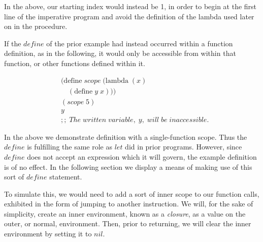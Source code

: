 In the above, our starting index would instead be 1, in order to begin at the first
line of the imperative program and avoid the definition of the lambda used later on
in the procedure.

If the $define$ of the prior example had instead occurred within a function definition, 
as in the following, it would only be accessible from within that function, or other 
functions defined within it.

\begin{figure}[ht]
\caption{}\label{scheme}
\begin{align*}
& (\text{define} \; scope \; (\text{lambda} \; (x)
\\& \quad (\text{define} \; y \; x)))
\\& (scope \; 5)
\\& y
\\& ;; \; The \; written \; variable, \; y, \; will \; be \; inaccessible.
\end{align*}
\end{figure}

In the above we demonstrate definition with a single-function scope. Thus the 
$define$ is fulfilling the same role as $let$ did in prior programs. However, since 
$define$ does not accept an expression which it will govern, the example definition 
is of no effect. In the following section we display a means of making use of this 
sort of $define$ statement.

To simulate this, we would need to add a sort of inner scope to our function calls, 
exhibited in the form of jumping to another instruction. We will, for the sake of
simplicity, create an inner environment, known as a \emph{closure}, as a value on the
outer, or normal, environment. Then, prior to returning, we will clear the inner 
environment by setting it to $nil$.

